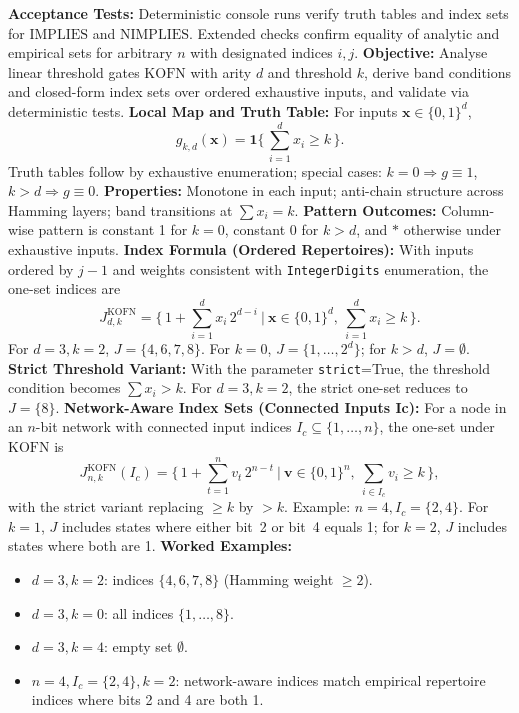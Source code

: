 \textbf{Acceptance Tests:} Deterministic console runs verify truth tables and index sets for \(\mathrm{IMPLIES}\) and \(\mathrm{NIMPLIES}\). Extended checks confirm equality of analytic and empirical sets for arbitrary \(n\) with designated indices \(i,j\).
\textbf{Objective:} Analyse linear threshold gates \(\mathrm{KOFN}\) with arity \(d\) and threshold \(k\), derive band conditions and closed-form index sets over ordered exhaustive inputs, and validate via deterministic tests.
\textbf{Local Map and Truth Table:} For inputs \(\mathbf{x}\in\{0,1\}^d\),
\[
g_{k,d}(\mathbf{x}) = \mathbf{1}\{\,\sum_{i=1}^{d} x_i \ge k\,\}.
\]
Truth tables follow by exhaustive enumeration; special cases: \(k=0\Rightarrow g\equiv 1\), \(k>d\Rightarrow g\equiv 0\).
\textbf{Properties:} Monotone in each input; anti-chain structure across Hamming layers; band transitions at \(\sum x_i = k\).
\textbf{Pattern Outcomes:} Column-wise pattern is constant 1 for \(k=0\), constant 0 for \(k>d\), and \(*\) otherwise under exhaustive inputs.
\textbf{Index Formula (Ordered Repertoires):} With inputs ordered by \(j-1\) and weights consistent with \texttt{IntegerDigits} enumeration, the one-set indices are
\[
J^{\mathrm{KOFN}}_{d,k} = \Big\{\, 1 + \sum_{i=1}^{d} x_i\,2^{d-i} \ \Big| \ \mathbf{x}\in\{0,1\}^d,\ \sum_{i=1}^{d} x_i \ge k\,\Big\}.
\]
For \(d=3, k=2\), \(J=\{4,6,7,8\}\). For \(k=0\), \(J=\{1,\dots,2^d\}\); for \(k>d\), \(J=\emptyset\).
\textbf{Strict Threshold Variant:} With the parameter \texttt{strict}=True, the threshold condition becomes \(\sum x_i > k\). For \(d=3, k=2\), the strict one-set reduces to \(J=\{8\}\).
\textbf{Network-Aware Index Sets (Connected Inputs Ic):} For a node in an \(n\)-bit network with connected input indices \(I_c\subseteq\{1,\dots,n\}\), the one-set under \(\mathrm{KOFN}\) is
\[
J^{\mathrm{KOFN}}_{n,k}(I_c) = \Big\{\, 1 + \sum_{t=1}^{n} v_t\,2^{n-t} \ \Big| \ \mathbf{v}\in\{0,1\}^n,\ \sum_{i\in I_c} v_i \ge k\,\Big\},
\]
with the strict variant replacing \(\ge k\) by \(>k\). Example: \(n=4, I_c=\{2,4\}\). For \(k=1\), \(J\) includes states where either bit~2 or bit~4 equals 1; for \(k=2\), \(J\) includes states where both are 1.
\textbf{Worked Examples:}
\begin{itemize}
\item \(d=3, k=2\): indices \(\{4,6,7,8\}\) (Hamming weight \(\ge 2\)).
\item \(d=3, k=0\): all indices \(\{1,\dots,8\}\).
\item \(d=3, k=4\): empty set \(\emptyset\).
\item \(n=4, I_c=\{2,4\}, k=2\): network-aware indices match empirical repertoire indices where bits 2 and 4 are both 1.
\end{itemize}
